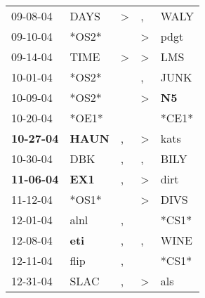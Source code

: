 \begin{supertabular}{p{0.07\textwidth}p{0.06\textwidth}p{0.02\textwidth}p{0.02\textwidth}p{0.06\textwidth}}
          09-08-04\textsuperscript{} &           DAYS\textsuperscript{} &     \textgreater &                , &           WALY\textsuperscript{} \\
          09-10-04\textsuperscript{} &                            *OS2* &                  &     \textgreater &           pdgt\textsuperscript{} \\
          09-14-04\textsuperscript{} &           TIME\textsuperscript{} &     \textgreater &     \textgreater &            LMS\textsuperscript{} \\
          10-01-04\textsuperscript{} &                            *OS2* &                  &                , &           JUNK\textsuperscript{} \\
          10-09-04\textsuperscript{} &                            *OS2* &                  &     \textgreater &    \textbf{N5\textsuperscript{}} \\
          10-20-04\textsuperscript{} &                            *OE1* &                  &                  &                            *CE1* \\
 \textbf{10-27-04\textsuperscript{}} &  \textbf{HAUN\textsuperscript{}} &                , &     \textgreater &           kats\textsuperscript{} \\
          10-30-04\textsuperscript{} &            DBK\textsuperscript{} &                , &                , &           BILY\textsuperscript{} \\
 \textbf{11-06-04\textsuperscript{}} &   \textbf{EX1\textsuperscript{}} &                , &     \textgreater &           dirt\textsuperscript{} \\
          11-12-04\textsuperscript{} &                            *OS1* &                  &     \textgreater &           DIVS\textsuperscript{} \\
          12-01-04\textsuperscript{} &           alnl\textsuperscript{} &                , &                  &                            *CS1* \\
          12-08-04\textsuperscript{} &   \textbf{eti\textsuperscript{}} &                , &                , &           WINE\textsuperscript{} \\
          12-11-04\textsuperscript{} &           flip\textsuperscript{} &                , &                  &                            *CS1* \\
          12-31-04\textsuperscript{} &           SLAC\textsuperscript{} &                , &     \textgreater &            als\textsuperscript{} \\

\end{supertabular}
